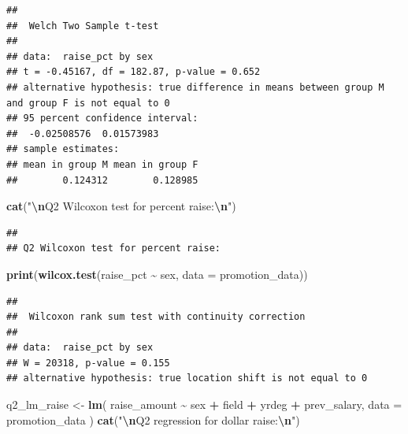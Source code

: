 \documentclass[
]{article}
\newenvironment{Shaded}{\begin{snugshade}}{\end{snugshade}}
\newcommand{\AttributeTok}[1]{\textcolor[rgb]{0.13,0.29,0.53}{#1}}
\newcommand{\FunctionTok}[1]{\textcolor[rgb]{0.13,0.29,0.53}{\textbf{#1}}}
\newcommand{\NormalTok}[1]{#1}
\newcommand{\OtherTok}[1]{\textcolor[rgb]{0.56,0.35,0.01}{#1}}
\newcommand{\SpecialCharTok}[1]{\textcolor[rgb]{0.81,0.36,0.00}{\textbf{#1}}}
\newcommand{\StringTok}[1]{\textcolor[rgb]{0.31,0.60,0.02}{#1}}
\begin{document}
\begin{verbatim}
## 
##  Welch Two Sample t-test
## 
## data:  raise_pct by sex
## t = -0.45167, df = 182.87, p-value = 0.652
## alternative hypothesis: true difference in means between group M and group F is not equal to 0
## 95 percent confidence interval:
##  -0.02508576  0.01573983
## sample estimates:
## mean in group M mean in group F 
##        0.124312        0.128985
\end{verbatim}

\begin{Shaded}
\begin{Highlighting}[]
\FunctionTok{cat}\NormalTok{(}\StringTok{"}\SpecialCharTok{\textbackslash{}n}\StringTok{Q2 Wilcoxon test for percent raise:}\SpecialCharTok{\textbackslash{}n}\StringTok{"}\NormalTok{)}
\end{Highlighting}
\end{Shaded}

\begin{verbatim}
## 
## Q2 Wilcoxon test for percent raise:
\end{verbatim}

\begin{Shaded}
\begin{Highlighting}[]
\FunctionTok{print}\NormalTok{(}\FunctionTok{wilcox.test}\NormalTok{(raise\_pct }\SpecialCharTok{\textasciitilde{}}\NormalTok{ sex, }\AttributeTok{data =}\NormalTok{ promotion\_data))}
\end{Highlighting}
\end{Shaded}

\begin{verbatim}
## 
##  Wilcoxon rank sum test with continuity correction
## 
## data:  raise_pct by sex
## W = 20318, p-value = 0.155
## alternative hypothesis: true location shift is not equal to 0
\end{verbatim}

\begin{Shaded}
\begin{Highlighting}[]
\NormalTok{q2\_lm\_raise }\OtherTok{\textless{}{-}} \FunctionTok{lm}\NormalTok{(}
\NormalTok{  raise\_amount }\SpecialCharTok{\textasciitilde{}}\NormalTok{ sex }\SpecialCharTok{+}\NormalTok{ field }\SpecialCharTok{+}\NormalTok{ yrdeg }\SpecialCharTok{+}\NormalTok{ prev\_salary,}
  \AttributeTok{data =}\NormalTok{ promotion\_data}
\NormalTok{)}
\FunctionTok{cat}\NormalTok{(}\StringTok{"}\SpecialCharTok{\textbackslash{}n}\StringTok{Q2 regression for dollar raise:}\SpecialCharTok{\textbackslash{}n}\StringTok{"}\NormalTok{)}
\end{Highlighting}
\end{Shaded}
\end{document}
